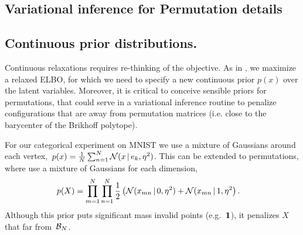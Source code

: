 \documentclass[twoside]{article}
\begin{document}


\subsection*{Variational inference for Permutation details}

\subsection*{Continuous prior distributions.} 
Continuous relaxations requires
re-thinking of the objective. As in \cite{maddison2016concrete}, we
maximize a relaxed ELBO, for which we need to specify a new continuous
prior $p(x)$ over the latent variables. Moreover, it is critical to conceive sensible priors for permutations, that could serve in a variational inference routine to penalize configurations that are away from permutation matrices (i.e. close to the barycenter of the Brikhoff polytope).

For our categorical experiment on MNIST we use a mixture of Gaussians around
each vertex,~${p(x) = \tfrac{1}{N} \sum_{n=1}^N \mathcal{N}(x \, | \, e_k, \eta^2)}$. 
This can be extended to permutations, where use a mixture of Gaussians for each
dimension,
\begin{align}
\label{eq:permprior}
  \nonumber p(X) &= \prod_{m=1}^N \prod_{n=1}^N
  \frac{1}{2} \left(\mathcal{N}(x_{mn} \, | \, 0, \eta^2) + \mathcal{N}(x_{mn} \, | \, 1, \eta^2 \right).
  \end{align}
Although this prior puts significant mass invalid points
(e.g.~$\boldsymbol{1}$), it penalizes $X$ that far from~$\mathcal{B}_N$.
\end{document}
